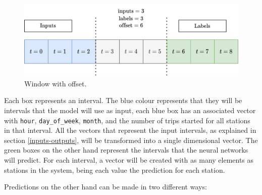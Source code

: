 \begin{figure}[H]
    \centering
    \includegraphics[width=12cm]{images/solution/modules/windows/windows-3.png}
    \caption{Window with offset.}
\end{figure}

Each box represents an interval. The blue colour represents that they will be intervals that the model will use as input, each blue box has an associated vector with \small{\verb|hour|}\normalsize, \small{\verb|day_of_week|}\normalsize, \small{\verb|month|}\normalsize, and the number of trips started for all stations in that interval. All the vectors that represent the input intervals, as explained in section \ref{inputs-outputs}, will be transformed into a single dimensional vector. The green boxes on the other hand represent the intervals that the neural networks will predict. For each interval, a vector will be created with as many elements as stations in the system, being each value the prediction for each station.
\newline


Predictions on the other hand can be made in two different ways:

